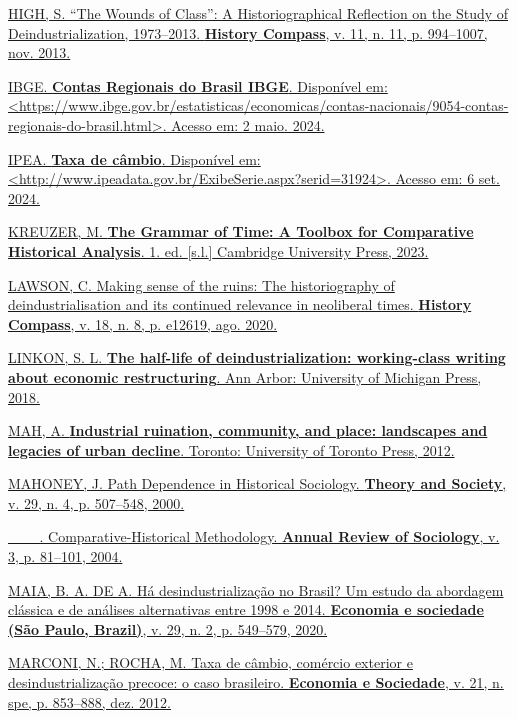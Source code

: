 {{\href{https://www.zotero.org/google-docs/?p3HTgZ}{HIGH, S. ``The Wounds
of Class'': A Historiographical Reflection on the Study of
Deindustrialization, 1973--2013. \textbf{History Compass}, v. 11, n. 11,
p. 994--1007, nov. 2013.}

\href{https://www.zotero.org/google-docs/?p3HTgZ}{IBGE. \textbf{Contas
Regionais do Brasil \textbar{} IBGE}. Disponível em:
\textless https://www.ibge.gov.br/estatisticas/economicas/contas-nacionais/9054-contas-regionais-do-brasil.html\textgreater.
Acesso em: 2 maio. 2024.}

\href{https://www.zotero.org/google-docs/?p3HTgZ}{IPEA. \textbf{Taxa de
câmbio}. Disponível em:
\textless http://www.ipeadata.gov.br/ExibeSerie.aspx?serid=31924\textgreater.
Acesso em: 6 set. 2024.}

\href{https://www.zotero.org/google-docs/?p3HTgZ}{KREUZER, M.
\textbf{The Grammar of Time: A Toolbox for Comparative Historical
Analysis}. 1. ed. {[}s.l.{]} Cambridge University Press, 2023.}

\href{https://www.zotero.org/google-docs/?p3HTgZ}{LAWSON, C. Making
sense of the ruins: The historiography of deindustrialisation and its
continued relevance in neoliberal times. \textbf{History Compass}, v.
18, n. 8, p. e12619, ago. 2020.}

\href{https://www.zotero.org/google-docs/?p3HTgZ}{LINKON, S. L.
\textbf{The half-life of deindustrialization: working-class writing
about economic restructuring}. Ann Arbor: University of Michigan Press,
2018.}

\href{https://www.zotero.org/google-docs/?p3HTgZ}{MAH, A.
\textbf{Industrial ruination, community, and place: landscapes and
legacies of urban decline}. Toronto: University of Toronto Press, 2012.}

\href{https://www.zotero.org/google-docs/?p3HTgZ}{MAHONEY, J. Path
Dependence in Historical Sociology. \textbf{Theory and Society}, v. 29,
n. 4, p. 507--548, 2000.}

\href{https://www.zotero.org/google-docs/?p3HTgZ}{\_\_\_.
Comparative-Historical Methodology. \textbf{Annual Review of Sociology},
v. 3, p. 81--101, 2004.}

\href{https://www.zotero.org/google-docs/?p3HTgZ}{MAIA, B. A. DE A. Há
desindustrialização no Brasil? Um estudo da abordagem clássica e de
análises alternativas entre 1998 e 2014. \textbf{Economia e sociedade
(São Paulo, Brazil)}, v. 29, n. 2, p. 549--579, 2020.}

\href{https://www.zotero.org/google-docs/?p3HTgZ}{MARCONI, N.; ROCHA, M.
Taxa de câmbio, comércio exterior e desindustrialização precoce: o caso
brasileiro. \textbf{Economia e Sociedade}, v. 21, n. spe, p. 853--888,
dez. 2012.}

}}

